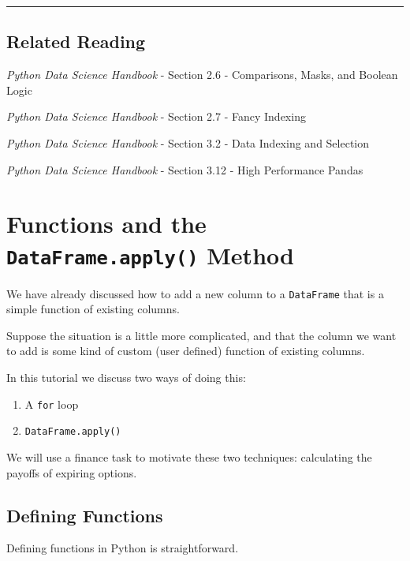 \documentclass[
  letterpaper,
  DIV=11,
  numbers=noendperiod]{scrreprt}
\begin{document}
\begin{center}\rule{0.5\linewidth}{0.5pt}\end{center}

\hypertarget{related-reading-2}{%
\section{Related Reading}\label{related-reading-2}}

\emph{Python Data Science Handbook} - Section 2.6 - Comparisons, Masks,
and Boolean Logic

\emph{Python Data Science Handbook} - Section 2.7 - Fancy Indexing

\emph{Python Data Science Handbook} - Section 3.2 - Data Indexing and
Selection

\emph{Python Data Science Handbook} - Section 3.12 - High Performance
Pandas

\hypertarget{functions-and-the-dataframe.apply-method}{%
\chapter{\texorpdfstring{Functions and the \texttt{DataFrame.apply()}
Method}{Functions and the DataFrame.apply() Method}}\label{functions-and-the-dataframe.apply-method}}

We have already discussed how to add a new column to a
\texttt{DataFrame} that is a simple function of existing columns.

Suppose the situation is a little more complicated, and that the column
we want to add is some kind of custom (user defined) function of
existing columns.

In this tutorial we discuss two ways of doing this:

\begin{enumerate}
\def\labelenumi{\arabic{enumi}.}
\item
  A \texttt{for} loop
\item
  \texttt{DataFrame.apply()}
\end{enumerate}

We will use a finance task to motivate these two techniques: calculating
the payoffs of expiring options.

\hypertarget{defining-functions}{%
\section{Defining Functions}\label{defining-functions}}

Defining functions in Python is straightforward.
\end{document}
